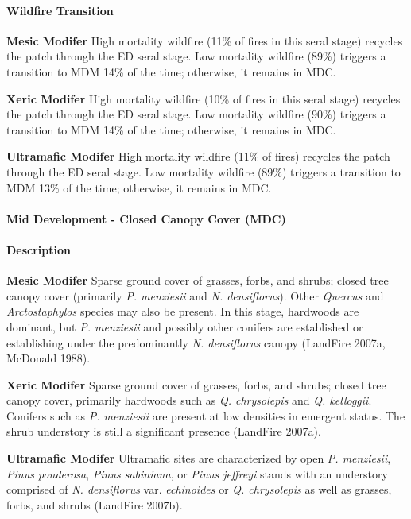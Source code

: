 \paragraph{Wildfire Transition}
\begin{adjustwidth}{2cm}{}
\textbf{Mesic Modifer } High mortality wildfire (11\% of fires in this seral stage) recycles the patch through the ED seral stage. Low mortality wildfire (89\%) triggers a transition to MDM 14\% of the time; otherwise, it remains in MDC.

\medskip
\noindent \textbf{Xeric Modifer} High mortality wildfire (10\% of fires in this seral stage) recycles the patch through the ED seral stage. Low mortality wildfire (90\%) triggers a transition to MDM 14\% of the time; otherwise, it remains in MDC.

\medskip
\noindent \textbf{Ultramafic Modifer} High mortality wildfire (11\% of fires) recycles the patch through the ED seral stage. Low mortality wildfire (89\%) triggers a transition to MDM 13\% of the time; otherwise, it remains in MDC.

\end{adjustwidth}
\noindent\hrulefill

\paragraph{Mid Development - Closed Canopy Cover (MDC)}

\paragraph{Description}
\begin{adjustwidth}{2cm}{}
\textbf{Mesic Modifer } Sparse ground cover of grasses, forbs, and shrubs; closed tree canopy cover (primarily \emph{P. menziesii} and \emph{N. densiflorus}). Other \emph{Quercus} and \emph{Arctostaphylos} species may also be present. In this stage, hardwoods are dominant, but \emph{P. menziesii} and possibly other conifers are established or establishing under the predominantly \emph{N. densiflorus} canopy (LandFire 2007a, McDonald 1988). 

\medskip
\noindent \textbf{Xeric Modifer} Sparse ground cover of grasses, forbs, and shrubs; closed tree canopy cover, primarily hardwoods such as \emph{Q. chrysolepis} and \emph{Q. kelloggii}. Conifers such as \emph{P. menziesii} are present at low densities in emergent status. The shrub understory is still a significant presence (LandFire 2007a). 

\medskip
\noindent \textbf{Ultramafic Modifer} Ultramafic sites are characterized by open \emph{P. menziesii}, \emph{Pinus ponderosa}, \emph{Pinus sabiniana}, or \emph{Pinus jeffreyi} stands with an understory comprised of \emph{N. densiflorus} var. \emph{echinoides} or \emph{Q. chrysolepis} as well as grasses, forbs, and shrubs (LandFire 2007b).

\end{adjustwidth}
